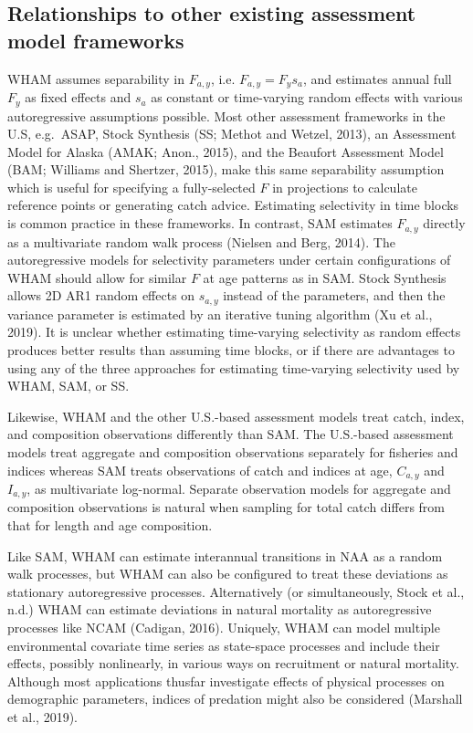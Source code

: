 \documentclass[]{article}
\begin{document}
\hypertarget{relationships-to-other-existing-assessment-model-frameworks}{%
\subsection{Relationships to other existing assessment model
frameworks}\label{relationships-to-other-existing-assessment-model-frameworks}}

WHAM assumes separability in \(F_{a,y}\), i.e. \(F_{a,y} = F_y s_a\),
and estimates annual full \(F_y\) as fixed effects and \(s_a\) as
constant or time-varying random effects with various autoregressive
assumptions possible. Most other assessment frameworks in the U.S,
e.g.~ASAP, Stock Synthesis (SS; Methot and Wetzel, 2013), an Assessment
Model for Alaska (AMAK; Anon., 2015), and the Beaufort Assessment Model
(BAM; Williams and Shertzer, 2015), make this same separability
assumption which is useful for specifying a fully-selected \(F\) in
projections to calculate reference points or generating catch advice.
Estimating selectivity in time blocks is common practice in these
frameworks. In contrast, SAM estimates \(F_{a,y}\) directly as a
multivariate random walk process (Nielsen and Berg, 2014). The
autoregressive models for selectivity parameters under certain
configurations of WHAM should allow for similar \(F\) at age patterns as
in SAM. Stock Synthesis allows 2D AR1 random effects on \(s_{a,y}\)
instead of the parameters, and then the variance parameter is estimated
by an iterative tuning algorithm (Xu et al., 2019). It is unclear
whether estimating time-varying selectivity as random effects produces
better results than assuming time blocks, or if there are advantages to
using any of the three approaches for estimating time-varying
selectivity used by WHAM, SAM, or SS.

Likewise, WHAM and the other U.S.-based assessment models treat catch,
index, and composition observations differently than SAM. The U.S.-based
assessment models treat aggregate and composition observations
separately for fisheries and indices whereas SAM treats observations of
catch and indices at age, \(C_{a,y}\) and \(I_{a,y}\), as multivariate
log-normal. Separate observation models for aggregate and composition
observations is natural when sampling for total catch differs from that
for length and age composition.

Like SAM, WHAM can estimate interannual transitions in NAA as a random
walk processes, but WHAM can also be configured to treat these
deviations as stationary autoregressive processes. Alternatively (or
simultaneously, Stock et al., n.d.) WHAM can estimate deviations in
natural mortality as autoregressive processes like NCAM (Cadigan, 2016).
Uniquely, WHAM can model multiple environmental covariate time series as
state-space processes and include their effects, possibly nonlinearly,
in various ways on recruitment or natural mortality. Although most
applications thusfar investigate effects of physical processes on
demographic parameters, indices of predation might also be considered
(Marshall et al., 2019).
\end{document}
